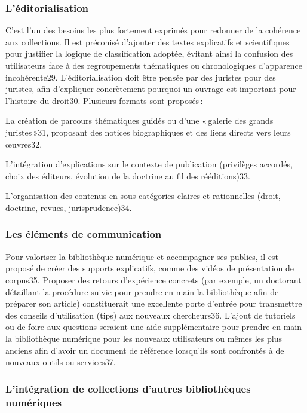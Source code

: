\subsubsection{L’éditorialisation} 

C’est l’un des besoins les plus fortement exprimés pour redonner de la cohérence aux collections. Il est préconisé d’ajouter des textes explicatifs et scientifiques pour justifier la logique de classification adoptée, évitant ainsi la confusion des utilisateurs face à des regroupements thématiques ou chronologiques d’apparence incohérente29. L’éditorialisation doit être pensée par des juristes pour des juristes, afin d’expliquer concrètement pourquoi un ouvrage est important pour l’histoire du droit30. Plusieurs formats sont proposés :  

La création de parcours thématiques guidés ou d’une « galerie des grands juristes »31, proposant des notices biographiques et des liens directs vers leurs œuvres32. 

L’intégration d’explications sur le contexte de publication (privilèges accordés, choix des éditeurs, évolution de la doctrine au fil des rééditions)33.  

L’organisation des contenus en sous-catégories claires et rationnelles (droit, doctrine, revues, jurisprudence)34. 

\subsubsection{Les éléments de communication} 

Pour valoriser la bibliothèque numérique et accompagner ses publics, il est proposé de créer des supports explicatifs, comme des vidéos de présentation de corpus35. Proposer des retours d’expérience concrets (par exemple, un doctorant détaillant la procédure suivie pour prendre en main la bibliothèque afin de préparer son article) constituerait une excellente porte d’entrée pour transmettre des conseils d’utilisation (tips) aux nouveaux chercheurs36. L’ajout de tutoriels ou de foire aux questions seraient une aide supplémentaire pour prendre en main la bibliothèque numérique pour les nouveaux utilisateurs ou mêmes les plus anciens afin d’avoir un document de référence lorsqu’ils sont confrontés à de nouveaux outils ou services37.  

\subsubsection{L’intégration de collections d’autres bibliothèques numériques}

